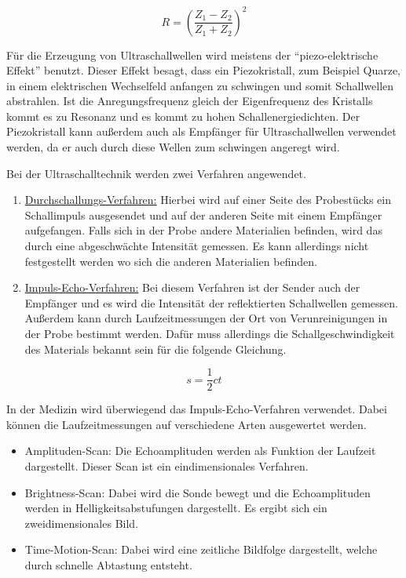\begin{equation*}
  R = \left( \frac{Z_1 - Z_2}{Z_1 + Z_2} \right)^2
\end{equation*}

Für die Erzeugung von Ultraschallwellen wird meistens der \enquote{piezo-elektrische Effekt}
benutzt. Dieser Effekt besagt, dass ein Piezokristall, zum Beispiel Quarze, in einem
elektrischen Wechselfeld anfangen zu schwingen und somit Schallwellen abstrahlen.
Ist die Anregungsfrequenz gleich der Eigenfrequenz des Kristalls kommt es zu Resonanz
und es kommt zu hohen Schallenergiedichten.
Der Piezokristall kann außerdem auch als Empfänger für Ultraschallwellen verwendet
werden, da er auch durch diese Wellen zum schwingen angeregt wird.

Bei der Ultraschalltechnik werden zwei Verfahren angewendet.

\begin{enumerate}
  \item \underline{Durchschallungs-Verfahren:} Hierbei wird auf einer Seite des Probestücks
  ein Schallimpuls ausgesendet und auf der anderen Seite mit einem Empfänger aufgefangen.
  Falls sich in der Probe andere Materialien befinden, wird das durch eine abgeschwächte
  Intensität gemessen. Es kann allerdings nicht festgestellt werden wo sich die anderen
  Materialien befinden.
  \item \underline{Impuls-Echo-Verfahren:} Bei diesem Verfahren ist der Sender auch der Empfänger
  und es wird die Intensität der reflektierten Schallwellen gemessen. Außerdem kann
  durch Laufzeitmessungen der Ort von Verunreinigungen in der Probe bestimmt werden.
  Dafür muss allerdings die Schallgeschwindigkeit des Materials bekannt sein für die
  folgende Gleichung.
\end{enumerate}

\begin{equation}
  s = \frac{1}{2} c t
  \label{eq:1}
\end{equation}

In der Medizin wird überwiegend das Impuls-Echo-Verfahren verwendet. Dabei können die
Laufzeitmessungen auf verschiedene Arten ausgewertet werden.

\begin{itemize}
  \item Amplituden-Scan: Die Echoamplituden werden als Funktion der Laufzeit dargestellt.
  Dieser Scan ist ein eindimensionales Verfahren.
  \item Brightness-Scan: Dabei wird die Sonde bewegt und die Echoamplituden werden in
  Helligkeitsabstufungen dargestellt. Es ergibt sich ein zweidimensionales Bild.
  \item Time-Motion-Scan: Dabei wird eine zeitliche Bildfolge dargestellt, welche
  durch schnelle Abtastung entsteht.
\end{itemize}
